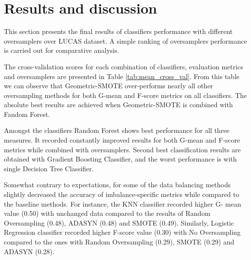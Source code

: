 \documentclass[parskip=full]{scrartcl}
\begin{document}
\section{Results and discussion}

This section presents the final results of classifiers performance with
different oversamplers over LUCAS dataset. A simple ranking of oversamplers
performance is carried out for comparative analysis.

The cross-validation scores for each combination of classifiers, evaluation
metrics and oversamplers are presented in Table \ref{tab:mean_cross_val}. From
this table we can observe that Geometric-SMOTE over-performs nearly all other
oversampling methods for both G-mean and F-score metrics on all classifiers. The
absolute best results are achieved when Geometric-SMOTE is combined with Fandom
Forest.


Amongst the classifiers Random Forest shows best performance for all three
measures. It recorded constantly improved results for both G-mean and F-score
metrics while combined with oversamplers. Second best classification results are
obtained with Gradient Boosting Classifier, and the worst performance is with
single Decision Tree Classifier.

Somewhat contrary to expectations, for some of the data balancing methods
slightly decreased the accuracy of imbalance-specific metrics while compared to
the baseline methods. For instance, the KNN classifier recorded higher G- mean
value (0.50) with unchanged data compared to the results of Random Oversampling
(0.48), ADASYN (0.48) and SMOTE (0.49). Similarly, Logistic Regression
classifier recorded higher F-score value (0.30) with No Oversampling compared to
the ones with Random Oversampling (0.29), SMOTE (0.29) and ADASYN (0.28).
\end{document}
